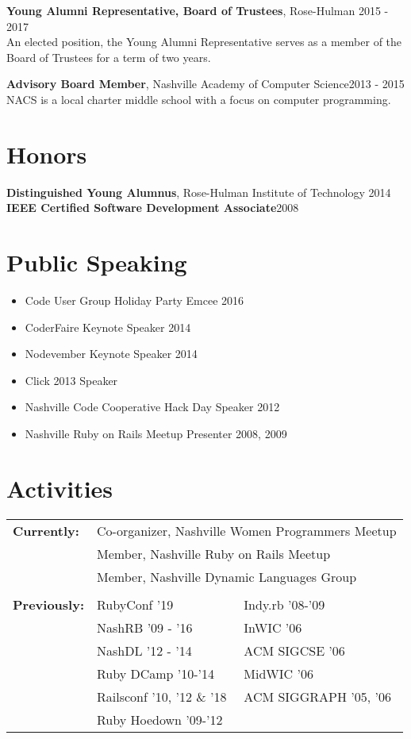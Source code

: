 \documentclass[line, margin, 10pt]{res}
\begin{document}
\begin{resume}
{\bf Young Alumni Representative, Board of Trustees}, Rose-Hulman 2015 - 2017\\
An elected position, the Young Alumni Representative serves as a member of the Board of Trustees for a term of two years.

{\bf Advisory Board Member}, Nashville Academy of Computer Science\hfill 2013 - 2015\\
NACS is a local charter middle school with a focus on computer programming.

\section{Honors}

{\bf Distinguished Young Alumnus}, Rose-Hulman Institute of Technology \hfill 2014\\
{\bf IEEE Certified Software Development Associate}\hfill 2008

\section{Public Speaking}

\begin{itemize}\itemsep -2pt
  \item Code User Group Holiday Party Emcee 2016
  \item CoderFaire Keynote Speaker 2014
  \item Nodevember Keynote Speaker 2014
  \item Click 2013 Speaker
  \item Nashville Code Cooperative Hack Day Speaker 2012
  \item Nashville Ruby on Rails Meetup Presenter 2008, 2009
\end{itemize}

\section{Activities}

\begin{tabular}[t]{@{} p{1.2in} p{1.9in} p{1.9in} @{}}
\bf{Currently:}

& \multicolumn{2}{p{3.8in}}{ Co-organizer, Nashville Women Programmers Meetup} \\ %
& \multicolumn{2}{p{3.8in}}{ Member, Nashville Ruby on Rails Meetup} \\ %
& \multicolumn{2}{p{3.8in}}{ Member, Nashville Dynamic Languages Group} \\ %
\\
\bf{Previously:}
& RubyConf '19  & Indy.rb '08-'09  \\
& NashRB '09 - '16 &  InWIC '06\\
& NashDL '12 - '14 & ACM SIGCSE '06 \\
& Ruby DCamp '10-'14 & MidWIC '06   \\
& Railsconf '10, '12 \& '18 & ACM SIGGRAPH '05, '06 \\
& Ruby Hoedown '09-'12

\end{tabular}
\end{resume}
\end{document}
